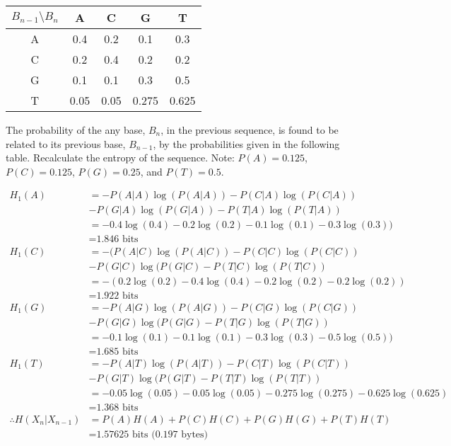 \begin{question}
\begin{table}[h]
\renewcommand{\arraystretch}{1.3}
\centering
\begin{tabular}{c||c|c|c|c}
\hline
 $B_{n-1} \text{\textbackslash} B_{n} $ & A  & C  & G & T \\
 \hline\hline
A & 0.4 & 0.2 & 0.1 & 0.3 \\
C & 0.2 & 0.4 & 0.2 & 0.2 \\
G & 0.1 & 0.1 & 0.3 & 0.5 \\
T & 0.05&0.05 &0.275&0.625 \\
\hline
\end{tabular}
\end{table}

The probability of the any base, $B_n$, in the previous sequence, is found to be related to its previous base, $B_{n-1}$, by the probabilities given in the following table. Recalculate the entropy of the sequence.
Note: $P(A) = 0.125$, $P(C) = 0.125$, $P(G) = 0.25$, and $P(T) = 0.5$.

\end{question}
\begin{solution}
\begin{equation}
\begin{aligned}
H_1(A) &= - P(A|A)\log(P(A|A)) - P(C|A)\log(P(C|A)) \\
&- P(G|A)\log(P(G|A)) - P(T|A)\log(P(T|A)) \\
&=  -0.4\log(0.4)  -0.2\log(0.2) -0.1\log(0.1) -0.3\log(0.3)) \\
&= \text{1.846 bits}  \\
H_1(C) &= -( P(A|C)\log(P(A|C)) - P(C|C)\log(P(C|C)) \\
&- P(G|C)\log(P(G|C) - P(T|C)\log(P(T|C)) \\
&= - (  0.2\log(0.2) - 0.4\log(0.4) - 0.2\log(0.2)- 0.2\log(0.2)) \\
&= \text{1.922 bits}  \\
H_1(G) &= -P(A|G)\log(P(A|G)) - P(C|G)\log(P(C|G)) \\ 
&- P(G|G)\log(P(G|G) - P(T|G)\log(P(T|G)) \\
&= -0.1\log(0.1) - 0.1\log(0.1) - 0.3\log(0.3)- 0.5\log(0.5)) \\
&= \text{1.685 bits}  \\
H_1(T) &= -P(A|T)\log(P(A|T)) - P(C|T)\log(P(C|T)) \\
&- P(G|T)\log(P(G|T) - P(T|T)\log(P(T|T)) \\
&= -0.05\log(0.05) - 0.05\log(0.05) - 0.275\log(0.275)- 0.625\log(0.625) \\
&= \text{1.368 bits}  \\
\therefore H(X_n|X_{n-1}) &= P(A)H(A) + P(C)H(C) + P(G)H(G) + P(T)H(T) \\
&= \text{1.57625 bits (0.197 bytes)}
\end{aligned}
\end{equation}

\end{solution}

